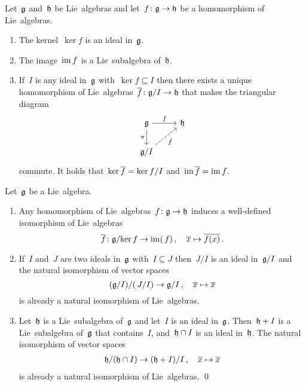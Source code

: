 \begin{proposition}
  Let~$\mathfrak{g}$ and~$\mathfrak{h}$ be Lie~algebras and let~$f \colon \mathfrak{g} \to \mathfrak{h}$ be a homomorphism of Lie~algebras.
  \begin{enumerate}
    \item
      The kernel~$\ker f$ is an ideal in~$\mathfrak{g}$.
    \item
      The image~$\operatorname{im} f$ is a Lie~subalgebra of~$\mathfrak{h}$.
    \item
      If~$I$ is any ideal in~$\mathfrak{g}$ with~$\ker f \subseteq I$ then there exists a unique homomorphism of Lie~algebras~$\overline{f} \colon \mathfrak{g}/I \to \mathfrak{h}$ that makes the triangular diagram
      \[
        \begin{tikzcd}
          \glie
          \arrow{r}[above]{f}
          \arrow{d}[left]{\pi}
          &
          \hlie
          \\
          \glie/I
          \arrow[dashed]{ur}[below right]{\tilde{f}}
          &
          {}
        \end{tikzcd}
      \]
      commute.
      It holds that~$\ker \overline{f} = {\ker f}/I$ and~$\operatorname{im} \overline{f} = \operatorname{im} f$.
  \end{enumerate}
\end{proposition}


\begin{corollary}
  Let~$\mathfrak{g}$ be a Lie~algebra.
  \begin{enumerate}
    \item
      Any homomorphism of Lie~algebras~$f \colon \mathfrak{g} \to \mathfrak{h}$ induces a well-defined isomorphism of Lie~algebras
      \[
        \overline{f}
        \colon
        \mathfrak{g}/{\ker f}
        \to
        \operatorname{im}(\, f)  \,,
        \quad
        \overline{x}
        \mapsto
        \overline{f(x)}  \,.
      \]
    \item
      If~$I$ and~$J$ are two ideals in~$\mathfrak{g}$ with~$I \subseteq J$ then~$J/I$ is an ideal in~$\mathfrak{g}/I$ and the natural isomorphism of vector spaces
      \[
        (\mathfrak{g}/I) / (\, J/I)
        \to
        \mathfrak{g}/I \,,
        \quad
        \overline{x}
        \mapsto
        \overline{x}
      \]
      is already a natural isomorphism of Lie~algebras.
    \item
      Let~$\mathfrak{h}$ is a Lie~subalgebra of~$\mathfrak{g}$ and let~$I$ is an ideal in~$\mathfrak{g}$.
      Then~$\mathfrak{h} + I$ is a Lie~subalgebra of~$\mathfrak{g}$ that contains~$I$, and~$\mathfrak{h} \cap I$ is an ideal in~$\mathfrak{h}$.
      The natural isomorphism of vector spaces
      \begin{gather*}
        \mathfrak{h}/(\mathfrak{h} \cap I)
        \to
        (\mathfrak{h} + I)/I \,,
        \quad
        \overline{x}
        \mapsto
        \overline{x}
      \end{gather*}
      is already a natural isomorphism of Lie~algebras.
    \qed
  \end{enumerate}
\end{corollary}



